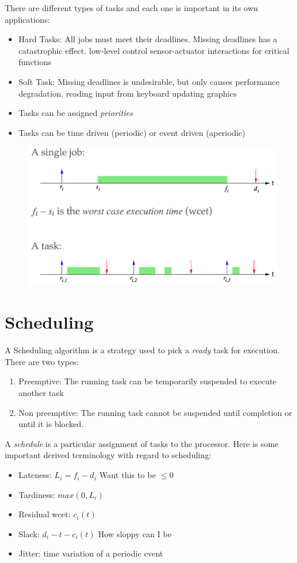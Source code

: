 \documentclass{hw}
\begin{document}
There are different types of tasks and each one is important in its own
applications:
\begin{itemize}
  \item Hard Tasks: All jobs must meet their deadlines. Missing deadlines has 
    a catastrophic effect.
    \subitem low-level control
    \subitem sensor-actuator interactions for critical functions
  \item Soft Task: Missing deadlines is undesirable, but only causes performance
    degradation.
    \subitem reading input from keyboard
    \subitem updating graphics
  \item Tasks can be assigned \emph{priorities}
  \item Tasks can be time driven (periodic) or event driven (aperiodic)
\end{itemize}

\begin{figure}[H]
  \centering
  \includegraphics[scale=.5]{img/jobtask}
\end{figure}

\section{Scheduling}
A Scheduling algorithm is a strategy used to pick a \emph{ready} task for 
execution. There are two types:
\begin{enumerate}
  \item Preemptive: The running task can be temporarily suspended to execute 
    another task
  \item Non preemptive: The running task cannot be suspended until completion or
    until it is blocked.
\end{enumerate}
A \emph{schedule} is a particular assignment of tasks to the processor. Here is 
some important derived terminology with regard to scheduling:
\begin{itemize}
  \item Lateness: $L_{i} = f_{i} - d_{i} $ Want this to be $\leq 0$
  \item Tardiness: $max(0,L_{i})$
  \item Residual wcet: $c_{i}(t)$
  \item Slack: $d_{i} - t - c_{i}(t)$  How sloppy can I be
  \item Jitter: time variation of a periodic event
\end{itemize}
\end{document}
